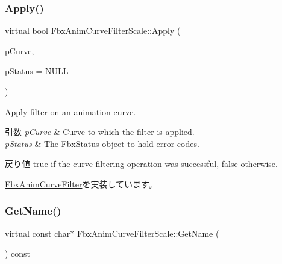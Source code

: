 \mbox{\label{class_fbx_anim_curve_filter_scale_a1d3234359a5766b4476e4a0522104d77}} 
\subsubsection{\texorpdfstring{Apply()}{Apply()}\hspace{0.1cm}{\footnotesize\ttfamily [5/5]}}
{\footnotesize\ttfamily virtual bool Fbx\+Anim\+Curve\+Filter\+Scale\+::\+Apply (\begin{DoxyParamCaption}\item[{\hyperlink{class_fbx_anim_curve}{Fbx\+Anim\+Curve} \&}]{p\+Curve,  }\item[{\hyperlink{class_fbx_status}{Fbx\+Status} $\ast$}]{p\+Status = {\ttfamily \hyperlink{fbxarch_8h_a070d2ce7b6bb7e5c05602aa8c308d0c4}{N\+U\+LL}} }\end{DoxyParamCaption})\hspace{0.3cm}{\ttfamily [virtual]}}

Apply filter on an animation curve. 
\begin{DoxyParams}{引数}
{\em p\+Curve} & Curve to which the filter is applied. \\
\hline
{\em p\+Status} & The \hyperlink{class_fbx_status}{Fbx\+Status} object to hold error codes. \\
\hline
\end{DoxyParams}
\begin{DoxyReturn}{戻り値}
{\ttfamily true} if the curve filtering operation was successful, {\ttfamily false} otherwise. 
\end{DoxyReturn}


\hyperlink{class_fbx_anim_curve_filter_a6a69996c47c0e6f63a0f8b0d5fa806a0}{Fbx\+Anim\+Curve\+Filter}を実装しています。

\mbox{\label{class_fbx_anim_curve_filter_scale_afffa13f0b3bbdcaa0a6d88d6aea2c83f}} 
\subsubsection{\texorpdfstring{Get\+Name()}{GetName()}}
{\footnotesize\ttfamily virtual const char$\ast$ Fbx\+Anim\+Curve\+Filter\+Scale\+::\+Get\+Name (\begin{DoxyParamCaption}{ }\end{DoxyParamCaption}) const\hspace{0.3cm}{\ttfamily [virtual]}}

